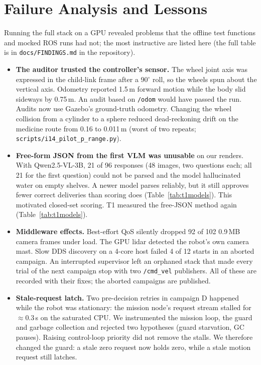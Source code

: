 \documentclass[conference]{IEEEtran}
\begin{document}
\section{Failure Analysis and Lessons}\label{sec:findings}
Running the full stack on a GPU revealed \NFindings{} problems that the \NTests{} offline test functions and mocked ROS runs had not; the most instructive are listed here (the full table is in \texttt{docs/FINDINGS.md} in the repository).
\begin{itemize}
\item \textbf{The auditor trusted the controller's sensor.} The wheel joint axis was expressed in the
child-link frame after a 90$^\circ$ roll, so the wheels spun about the vertical axis. Odometry reported 1.5\,m forward motion while the
body slid sideways by 0.75\,m. An audit based on \texttt{/odom} would have passed the run.
Audits now use Gazebo's ground-truth odometry. Changing the wheel collision from a cylinder to a sphere reduced
dead-reckoning drift on the medicine route from 0.16 to 0.011\,m (worst of two repeats; \texttt{scripts/i14\_pilot\_p\_range.py}).
\item \textbf{Free-form JSON from the first VLM was unusable} on our renders. With Qwen2.5-VL-3B, 21 of 96 responses (48 images, two questions each; all 21 for the first question) could not be parsed and the model hallucinated water on empty shelves.
A newer model parses reliably, but it still approves fewer correct deliveries than scoring does (Table~\ref{tab:t1models}).
This motivated closed-set scoring. T1 measured the free-JSON method again (Table~\ref{tab:t1models}).
\item \textbf{Middleware effects.} Best-effort QoS silently dropped 92 of 102 0.9\,MB camera frames under load. The GPU lidar
detected the robot's own camera mast. Slow DDS discovery on a 4-core host failed 4 of 12 starts in an aborted campaign.
An interrupted supervisor left an orphaned stack that made every trial of the next campaign stop with two
\texttt{/cmd\_vel} publishers. All of these are recorded with their fixes; the aborted campaigns are published.
\item \textbf{Stale-request latch.} Two pre-decision retries in campaign D happened while the robot was stationary: the mission node's
request stream stalled for $\approx$0.3\,s on the saturated CPU. We instrumented the mission loop, the guard
and garbage collection and rejected two hypotheses (guard starvation, GC pauses). Raising control-loop priority did not
remove the stalls. We therefore changed the guard: a stale zero request now holds zero, while a stale motion request still latches.

\end{itemize}
\end{document}
